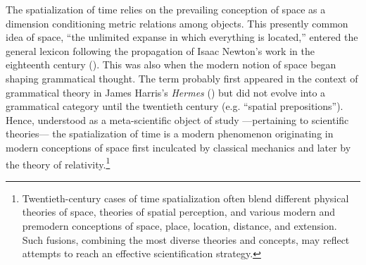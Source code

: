 \documentclass[output=paper]{langsci/langscibook}
\begin{document}
The spatialization of time relies on the prevailing conception of space as a dimension conditioning metric relations among objects. This presently common idea of space, “the unlimited expanse in which everything is located,” entered the general lexicon following the propagation of Isaac Newton’s work in the eighteenth century (\citealt{chalozin-dovrat_history_2019}). This was also when the modern notion of space began shaping grammatical thought. The term probably first appeared in the context of grammatical theory in James Harris’s \textit{Hermes} (\citeyear{harris_hermes:_1751}) but did not evolve into a grammatical category until the twentieth century (e.g. “spatial prepositions”). Hence, understood as a meta\nobreakdash-scientific object of study —pertaining to scientific theories— the spatialization of time is a modern phenomenon originating in modern conceptions of space first inculcated by classical mechanics and later by the theory of relativity.\footnote{Twentieth-century cases of time spatialization often blend different physical theories of space, theories of spatial perception, and various modern and premodern conceptions of space, place, location, distance, and extension. Such fusions, combining the most diverse theories and concepts, may reflect attempts to reach an effective scientification strategy.}
 
\end{document}
